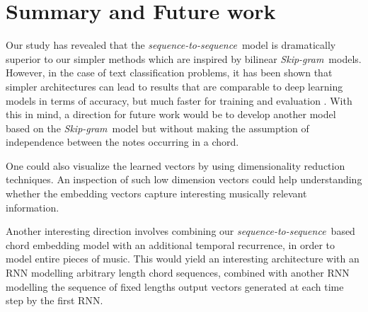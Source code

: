 \documentclass{article}
\newcommand{\skipgram}{\textit{Skip-gram}}
\newcommand{\seqtoseq}{\textit{sequence-to-sequence}}
\begin{document}
\section{Summary and Future work}
\label{sec:summary}
Our study has revealed that the \seqtoseq\ model is dramatically superior to our simpler methods which are inspired by bilinear \skipgram\ models. However, in the case of text classification problems, it has been shown that simpler architectures can lead to results that are comparable to deep learning models in terms of accuracy, but much faster for training and evaluation \citep{JoulinGBM16}.
With this in mind, a direction for future work would be to develop another model based on the \skipgram\ model but without making the assumption of independence between the notes occurring in a chord. 

One could also visualize the learned vectors by using dimensionality reduction techniques. An inspection of such low dimension vectors could help understanding whether the embedding vectors capture interesting musically relevant information.

Another interesting direction involves combining our \seqtoseq\ based chord embedding model with an additional temporal recurrence, in order to model entire pieces of music. This would yield an interesting architecture with an RNN modelling arbitrary length chord sequences, combined with another RNN modelling the sequence of fixed lengths output vectors generated at each time step by the first RNN.


 
\end{document}
